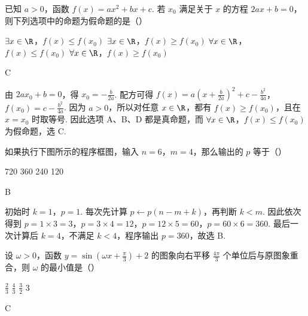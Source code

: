 \begin{problem}
已知 \(a>0\)，函数 \(f(x)=ax^2+bx+c\). 若 \(x_0\) 满足关于 \(x\) 的方程 \(2ax+b=0\)，则下列选项中的命题为假命题的是（\quad）

\choices
    {\(\exists x\in\R\)，\(f(x)\leqslant f(x_0)\)}
    {\(\exists x\in\R\)，\(f(x)\geqslant f(x_0)\)}
    {\(\forall x\in\R\)，\(f(x)\leqslant f(x_0)\)}
    {\(\forall x\in\R\)，\(f(x)\geqslant f(x_0)\)}
\end{problem}

\begin{answer}
C
\end{answer}

\begin{solution}
由 \(2ax_0+b=0\)，得 \(x_0=-\frac{b}{2a}\). 配方可得
\(f(x)=a\left(x+\frac{b}{2a}\right)^2+c-\frac{b^2}{4a}\)，\(f(x_0)=c-\frac{b^2}{4a}\).
因为 \(a>0\)，所以对任意 \(x\in\R\)，都有 \(f(x)\geqslant f(x_0)\)，且在 \(x=x_0\) 时取等号. 因此选项 A、B、D 都是真命题，而 \(\forall x\in\R\)，\(f(x)\leqslant f(x_0)\) 为假命题，选 C.
\end{solution}

\begin{problem}
如果执行下图所示的程序框图，输入 \(n=6\)，\(m=4\)，那么输出的 \(p\) 等于（\quad）


\choices
    {720}
    {360}
    {240}
    {120}
\end{problem}

\begin{answer}
B
\end{answer}

\begin{solution}
初始时 \(k=1\)，\(p=1\). 每次先计算 \(p\leftarrow p(n-m+k)\)，再判断 \(k<m\). 因此依次得到
\(p=1\times3=3\)，\(p=3\times4=12\)，\(p=12\times5=60\)，\(p=60\times6=360\).
最后一次计算后 \(k=4\)，不满足 \(k<4\)，程序输出 \(p=360\)，故选 B.
\end{solution}

\begin{problem}
设 \(\omega>0\)，函数 \(y=\sin\left(\omega x+\frac{\pi}{3}\right)+2\) 的图象向右平移 \(\frac{4\pi}{3}\) 个单位后与原图象重合，则 \(\omega\) 的最小值是（\quad）

\choices
    {\(\frac{2}{3}\)}
    {\(\frac{4}{3}\)}
    {\(\frac{3}{2}\)}
    {3}
\end{problem}

\begin{answer}
C
\end{answer}


